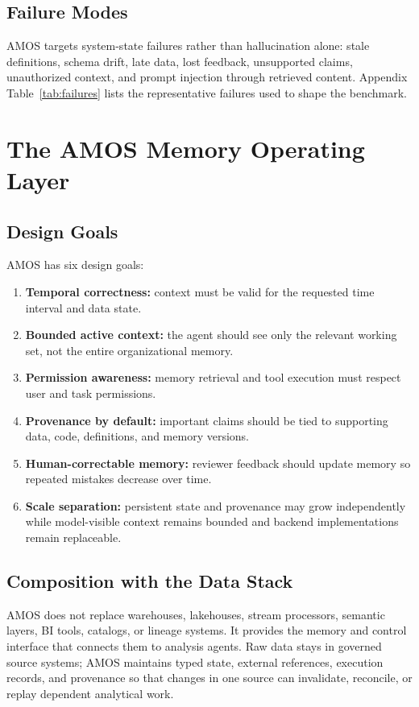 \documentclass[10pt]{article}
\newcommand{\amos}{\textsc{AMOS}\xspace}
\begin{document}
\subsection{Failure Modes}
\amos targets system-state failures rather than hallucination alone: stale definitions, schema drift, late data, lost feedback, unsupported claims, unauthorized context, and prompt injection through retrieved content. Appendix Table~\ref{tab:failures} lists the representative failures used to shape the benchmark.

\section{The AMOS Memory Operating Layer}

\subsection{Design Goals}
\amos has six design goals:
\begin{enumerate}
    \item \textbf{Temporal correctness:} context must be valid for the requested time interval and data state.
    \item \textbf{Bounded active context:} the agent should see only the relevant working set, not the entire organizational memory.
    \item \textbf{Permission awareness:} memory retrieval and tool execution must respect user and task permissions.
    \item \textbf{Provenance by default:} important claims should be tied to supporting data, code, definitions, and memory versions.
    \item \textbf{Human-correctable memory:} reviewer feedback should update memory so repeated mistakes decrease over time.
    \item \textbf{Scale separation:} persistent state and provenance may grow independently while model-visible context remains bounded and backend implementations remain replaceable.
\end{enumerate}

\subsection{Composition with the Data Stack}
\amos does not replace warehouses, lakehouses, stream processors, semantic layers, BI tools, catalogs, or lineage systems. It provides the memory and control interface that connects them to analysis agents. Raw data stays in governed source systems; \amos maintains typed state, external references, execution records, and provenance so that changes in one source can invalidate, reconcile, or replay dependent analytical work.
\end{document}

